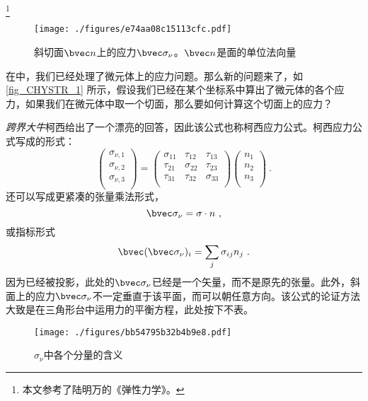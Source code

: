 
\footnote{本文参考了陆明万的《弹性力学》。}

\begin{figure}[ht]
\centering
\texttt{[image: ./figures/e74aa08c15113cfc.pdf]}
\caption{斜切面$\bvec n$上的应力$\bvec \sigma_\nu$。$\bvec n$是面的单位法向量} \label{fig_CHYSTR_1}
\end{figure}

在中，我们已经处理了微元体上的应力问题。那么新的问题来了，如\autoref{fig_CHYSTR_1} 所示，假设我们已经在某个坐标系中算出了微元体的各个应力，如果我们在微元体中取一个切面，那么要如何计算这个切面上的应力？

\textsl{跨界大牛}柯西给出了一个漂亮的回答，因此该公式也称柯西应力公式。柯西应力公式写成的形式：
\begin{equation}\label{eq_CHYSTR_1}
\begin{pmatrix}
\sigma_{\nu,1}\\
\sigma_{\nu,2}\\
\sigma_{\nu,3}\\
\end{pmatrix}
=
\begin{pmatrix}
\sigma_{11} & \tau_{12} & \tau_{13} \\
\tau_{21} & \sigma_{22} & \tau_{23} \\
\tau_{31} & \tau_{32} & \sigma_{33} \\
\end{pmatrix}
\begin{pmatrix}
n_1\\
n_2\\
n_3\\
\end{pmatrix}~.
\end{equation}
还可以写成更紧凑的张量乘法形式，
\begin{equation}
\bvec \sigma_\nu = \sigma \cdot n ~,
\end{equation}
或指标形式
\begin{equation}
\bvec (\bvec \sigma_\nu)_i = \sum_j \sigma_{ij} n_j~.
\end{equation}
因为已经被投影，此处的$\bvec \sigma_\nu$已经是一个矢量，而不是原先的张量。此外，斜面上的应力$\bvec \sigma_\nu$不一定垂直于该平面，而可以朝任意方向。该公式的论证方法大致是在三角形台中运用力的平衡方程，此处按下不表。

\begin{figure}[ht]
\centering
\texttt{[image: ./figures/bb54795b32b4b9e8.pdf]}
\caption{$\sigma_\nu$中各个分量的含义} \label{fig_CHYSTR_2}
\end{figure}

